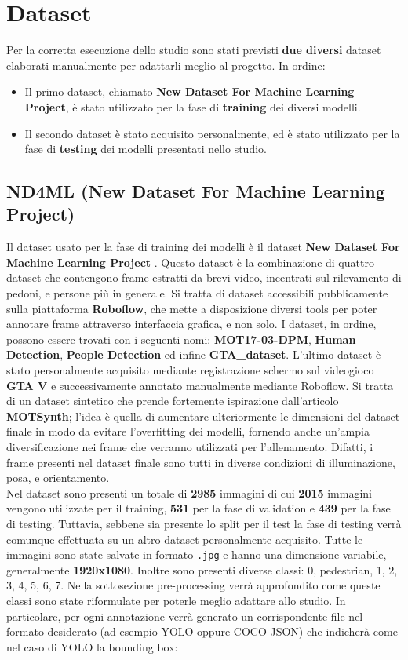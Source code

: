 \documentclass[12pt]{article}
\begin{document}
\section{Dataset}
Per la corretta esecuzione dello studio sono stati previsti \textbf{due diversi} dataset elaborati manualmente per adattarli meglio al progetto. In ordine:
\begin{itemize}
    \item Il primo dataset, chiamato \textbf{New Dataset For Machine Learning Project}, è stato utilizzato per la fase di \textbf{training} dei diversi modelli.
    \item Il secondo dataset è stato acquisito personalmente, ed è stato utilizzato per la fase di \textbf{testing} dei modelli presentati nello studio.
\end{itemize}
\subsection{ND4ML (New Dataset For Machine Learning Project)}
Il dataset usato per la fase di training dei modelli è il dataset \textbf{New Dataset For Machine Learning Project} \cite{Roboflow}. Questo dataset è la combinazione di quattro dataset che contengono frame estratti da brevi video, incentrati sul rilevamento di pedoni, e persone più in generale. Si tratta di dataset accessibili pubblicamente sulla piattaforma \textbf{Roboflow}, che mette a disposizione diversi tools per poter annotare frame attraverso interfaccia grafica, e non solo. I dataset, in ordine, possono essere trovati con i seguenti nomi: \textbf{MOT17-03-DPM}, \textbf{Human Detection}, \textbf{People Detection} ed infine \textbf{GTA\_dataset}. L'ultimo dataset è stato personalmente acquisito mediante registrazione schermo sul videogioco \textbf{GTA V} e successivamente annotato manualmente mediante Roboflow. Si tratta di un dataset sintetico che prende fortemente ispirazione dall'articolo \textbf{MOTSynth}\cite{MOTSynth}; l'idea è quella di aumentare ulteriormente le dimensioni del dataset finale in modo da evitare l'overfitting dei modelli, fornendo anche un'ampia diversificazione nei frame che verranno utilizzati per l'allenamento. Difatti, i frame presenti nel dataset finale sono tutti in diverse condizioni di illuminazione, posa, e orientamento. \\
Nel dataset sono presenti un totale di \textbf{2985} immagini di cui \textbf{2015} immagini vengono utilizzate per il training, \textbf{531} per la fase di validation e \textbf{439} per la fase di testing. Tuttavia, sebbene sia presente lo split per il test la fase di testing verrà comunque effettuata su un altro dataset personalmente acquisito. Tutte le immagini sono state salvate in formato \texttt{.jpg} e hanno una dimensione variabile, generalmente \textbf{1920x1080}. Inoltre sono presenti diverse classi: 0, pedestrian, 1, 2, 3, 4, 5, 6, 7. Nella sottosezione pre-processing verrà approfondito come queste classi sono state riformulate per poterle meglio adattare allo studio. In particolare, per ogni annotazione verrà generato un corrispondente file nel formato desiderato (ad esempio YOLO oppure COCO JSON) che indicherà come nel caso di YOLO la bounding box: 
\end{document}
